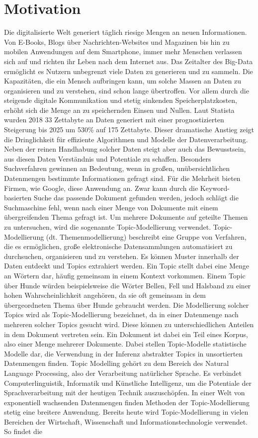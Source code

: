 \documentclass[german,version-2020-11]{uzl-thesis}
\begin{document}
\section{Motivation}
Die digitalisierte Welt generiert täglich riesige Mengen an neuen Informationen. Von E-Books, Blogs über Nachrichten-Websites und Magazinen bis hin zu mobilen Anwendungen auf dem Smartphone, immer mehr Menschen verlassen sich auf und richten ihr Leben nach dem Internet aus. Das Zeitalter des Big-Data ermöglicht es Nutzern unbegrenzt viele Daten zu generieren und zu sammeln. Die Kapazitäten, die ein Mensch aufbringen kann, um solche Massen an Daten zu organisieren und zu verstehen, sind schon lange übertroffen. Vor allem durch die steigende digitale Kommunikation und stetig sinkenden Speicherplatzkosten, erhöht sich die Menge an zu speichernden Einsen und Nullen. Laut Statista wurden 2018 33 Zettabyte an Daten generiert mit einer prognostizierten Steigerung bis 2025 um 530\% auf 175 Zettabyte. Dieser dramatische Anstieg zeigt die Dringlichkeit für effiziente Algorithmen und Modelle der Datenverarbeitung. Neben der reinen Handhabung solcher Daten steigt aber auch das Bewusstsein, aus diesen Daten Verständnis und Potentiale zu schaffen. Besonders Suchverfahren gewinnen an Bedeutung, wenn in großen, unübersichtlichen Datenmengen bestimmte Informationen gefragt sind. Für die Mehrheit bieten Firmen, wie Google, diese Anwendung an. Zwar kann durch die Keyword-basierten Suche das passende Dokument gefunden werden, jedoch schlägt die Suchmaschine fehl, wenn nach einer Menge von Dokumente mit einem übergreifenden Thema gefragt ist. Um mehrere Dokumente auf geteilte Themen zu untersuchen, wird die sogenannte Topic-Modellierung verwendet. Topic-Modellierung (dt. Themenmodellierung) beschreibt eine Gruppe von Verfahren, die es ermöglichen, große elektronische Datensammlungen automatisiert zu durchsuchen, organisieren und zu verstehen. Es können Muster innerhalb der Daten entdeckt und Topics extrahiert werden. Ein Topic stellt dabei eine Menge an Wörtern dar, häufig gemeinsam in einem Kontext vorkommen. Einem Topic über Hunde würden beispielsweise die Wörter Bellen, Fell und Halsband zu einer hohen Wahrscheinlichkeit angehören, da sie oft gemeinsam in dem übergeordneten Thema über Hunde gebraucht werden. Die Modellierung solcher Topics wird als Topic-Modellierung bezeichnet, da in einer Datenmenge nach mehreren solcher Topics gesucht wird. Diese können zu unterschiedlichen Anteilen in dem Dokument vertreten sein. Ein Dokument ist dabei ein Teil eines Korpus, also einer Menge mehrerer Dokumente. Dabei stellen Topic-Modelle statistische Modelle dar, die Verwendung in der Inferenz abstrakter Topics in unsortierten Datenmengen finden. Topic Modelling gehört zu dem Bereich des Natural Language Processing, also der Verarbeitung natürlicher Sprache. Es verbindet Computerlinguistik, Informatik und Künstliche Intelligenz, um die Potentiale der Sprachverarbeitung mit der heutigen Technik auszuschöpfen. In einer Welt von exponentiell wachsenden Datenmengen finden Methoden der Topic-Modellierung stetig eine breitere Anwendung. Bereits heute wird Topic-Modellierung in vielen Bereichen der Wirtschaft, Wissenschaft und Informationstechnologie verwendet. So findet die 
\end{document}
